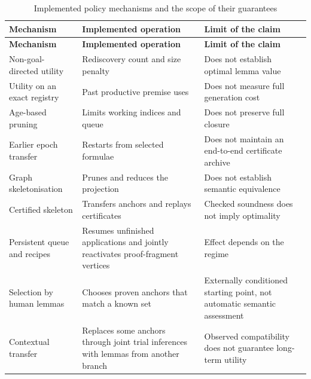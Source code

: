 \documentclass[pdflatex,sn-basic,Numbered]{sn-jnl}
\begin{document}
\begin{longtable}[]{@{}
  >{\raggedright\arraybackslash}p{}
  >{\raggedright\arraybackslash}p{}
  >{\raggedright\arraybackslash}p{}@{}}
\caption{Implemented policy mechanisms and the scope of their guarantees}\label{tab:9}\tabularnewline
\toprule\noalign{}
\begin{minipage}[b]{\linewidth}\raggedright
\textbf{Mechanism}
\end{minipage} & \begin{minipage}[b]{\linewidth}\raggedright
\textbf{Implemented operation}
\end{minipage} & \begin{minipage}[b]{\linewidth}\raggedright
\textbf{Limit of the claim}
\end{minipage} \\
\midrule\noalign{}
\endfirsthead
\toprule\noalign{}
\begin{minipage}[b]{\linewidth}\raggedright
\textbf{Mechanism}
\end{minipage} & \begin{minipage}[b]{\linewidth}\raggedright
\textbf{Implemented operation}
\end{minipage} & \begin{minipage}[b]{\linewidth}\raggedright
\textbf{Limit of the claim}
\end{minipage} \\
\midrule\noalign{}
\endhead
\bottomrule\noalign{}
\endlastfoot
Non-goal-directed utility & Rediscovery count and size penalty & Does not establish optimal lemma value \\
Utility on an exact registry & Past productive premise uses & Does not measure full generation cost \\
Age-based pruning & Limits working indices and queue & Does not preserve full closure \\
Earlier epoch transfer & Restarts from selected formulae & Does not maintain an end-to-end certificate archive \\
Graph skeletonisation & Prunes and reduces the projection & Does not establish semantic equivalence \\
Certified skeleton & Transfers anchors and replays certificates & Checked soundness does not imply optimality \\
Persistent queue and recipes & Resumes unfinished applications and jointly reactivates proof-fragment vertices & Effect depends on the regime \\
Selection by human lemmas & Chooses proven anchors that match a known set & Externally conditioned starting point, not automatic semantic assessment \\
Contextual transfer & Replaces some anchors through joint trial inferences with lemmas from another branch & Observed compatibility does not guarantee long-term utility \\
\end{longtable}
\end{document}
